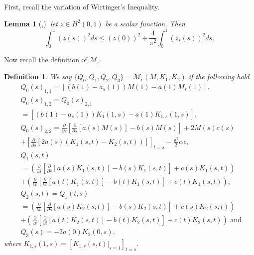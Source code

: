 \documentclass[9pt,journal,twocolumn]{IEEEtran}
\newtheorem{definition}{Definition}
\newtheorem{lemma}{Lemma}
\newcommand{\pfs}{\frac{\partial}{\partial s}}
\newcommand{\pft}{\frac{\partial}{\partial t}}
\begin{document}
\appendix\label{sec:appendix}
First, recall the variation  of Wirtinger's Inequality.
\begin{lemma}[\cite{hardy1952inequalities},\cite{krstic2008boundary}]
\label{lem:wirtinger}
 let $z \in H^2(0,1)$ be a scalar function. Then
  \[\int_0^1 (z(s))^2ds \leq (z(0))^2+ \frac{4}{\pi^2} \int_0^1 (z_s(s))^2 ds.\]
\end{lemma}
Now recall the definition of $\mathcal{M}_\epsilon$.
\begin{definition}
We say $\{Q_0,Q_1,Q_2,Q_3\}=\mathcal{M}_\epsilon(M,K_1,K_2)$ if the following hold
\begin{align}
 &Q_0(s)_{1,1}=\left[\left(b(1)-a_s(1) \right)M(1)-a(1)M_s(1) \right],\\
 &Q_0(s)_{1,2}=Q_0(s)_{2,1} \nonumber \\
 &=\left[\left(b(1)-a_s(1) \right)K_1(1,s)-a(1)K_{1,s}(1,s) \right], \\
&Q_0(s)_{2,2}=\pfs \left[ \pfs \left[ a(s)M(s)\right]-b(s)M(s) \right]+2M(s)c(s) \nonumber \\
&   +  \left[\pfs \left[2a(s)\left(K_1(s,t)-K_2(s,t) \right) \right] \right]_{t=s}-\frac{\pi^2}{2}\alpha \epsilon ,\\
&Q_1(s,t) \nonumber \\
&=\left(\pfs \left[\pfs \left[a(s)K_1(s,t)\right]-b(s)K_1(s,t) \right]+c(s)K_1(s,t) \right) \nonumber \\
&+\left(\pft \left[\pft \left[a(t)K_1(s,t)\right]-b(t)K_1(s,t) \right]+c(t)K_1(s,t) \right),  \\ 
&Q_2(s,t)=Q_1(t,s)\nonumber \\
&=\left(\pfs \left[\pfs \left[a(s)K_2(s,t)\right]-b(s)K_2(s,t) \right]+c(s)K_2(s,t) \right) \nonumber \\
&+\left(\pft \left[\pft \left[a(t)K_2(s,t)\right]-b(t)K_2(s,t) \right]+c(t)K_2(s,t) \right)\text{ and }\\
&Q_3(s)=-2a(0)K_2(0,s),
\end{align} where $ K_{1,s}(1,s)=\left[K_{1,s}(s,t)|_{s=1} \right]_{t=s}$.
\end{definition}
\end{document}
